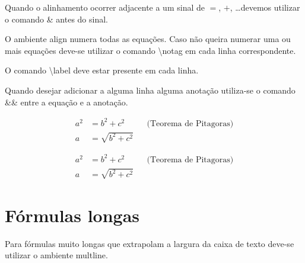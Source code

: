 Quando o alinhamento ocorrer adjacente a um sinal de $=$, $+$, \dots devemos utilizar o comando \& antes do sinal.

O ambiente \textsf{align} numera todas as equações. Caso não queira numerar uma ou mais equações deve-se utilizar o comando \textbackslash\textsf{notag} em cada linha correspondente.

O comando \textbackslash\textsf{label} deve estar presente em cada linha.

Quando desejar adicionar a alguma linha alguma anotação utiliza-se o comando \&\& entre a equação e a anotação. \\
\begin{minipage}[t]{0.47\linewidth} \vspace{-8pt}
    \begin{latexcode}
        \begin{align}
            a^2 &= b^2 + c^2 && \text{(Teorema de Pitagoras)} \\
            a &= \sqrt{b^2 + c^2}
        \end{align}
    \end{latexcode}
\end{minipage} \hfill
\begin{minipage}[t]{0.47\linewidth} \vspace{0pt}
    \begin{align}
        a^2 &= b^2 + c^2 && \text{(Teorema de Pitagoras)} \\
        a &= \sqrt{b^2 + c^2}
    \end{align}
\end{minipage}

\section{Fórmulas longas}
Para fórmulas muito longas que extrapolam a largura da caixa de texto deve-se utilizar o ambiente \textsf{multline}.

